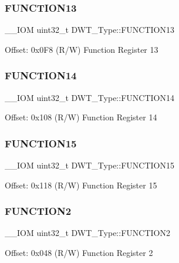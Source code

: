 \subsubsection{\texorpdfstring{FUNCTION13}{FUNCTION13}}
{\footnotesize\ttfamily \+\_\+\+\_\+\+I\+OM uint32\+\_\+t D\+W\+T\+\_\+\+Type\+::\+F\+U\+N\+C\+T\+I\+O\+N13}

Offset\+: 0x0\+F8 (R/W) Function Register 13 \mbox{\label{struct_d_w_t___type_a85138a411459f923ea8e05312d70af71}} 
\subsubsection{\texorpdfstring{FUNCTION14}{FUNCTION14}}
{\footnotesize\ttfamily \+\_\+\+\_\+\+I\+OM uint32\+\_\+t D\+W\+T\+\_\+\+Type\+::\+F\+U\+N\+C\+T\+I\+O\+N14}

Offset\+: 0x108 (R/W) Function Register 14 \mbox{\label{struct_d_w_t___type_a6e5fda09de44dfcd3e177c16028ceb74}} 
\subsubsection{\texorpdfstring{FUNCTION15}{FUNCTION15}}
{\footnotesize\ttfamily \+\_\+\+\_\+\+I\+OM uint32\+\_\+t D\+W\+T\+\_\+\+Type\+::\+F\+U\+N\+C\+T\+I\+O\+N15}

Offset\+: 0x118 (R/W) Function Register 15 \mbox{\label{struct_d_w_t___type_ab1b60d6600c38abae515bab8e86a188f}} 
\subsubsection{\texorpdfstring{FUNCTION2}{FUNCTION2}}
{\footnotesize\ttfamily \+\_\+\+\_\+\+I\+OM uint32\+\_\+t D\+W\+T\+\_\+\+Type\+::\+F\+U\+N\+C\+T\+I\+O\+N2}

Offset\+: 0x048 (R/W) Function Register 2 \mbox{\label{struct_d_w_t___type_a52d4ff278fae6f9216c63b74ce328841}} 
